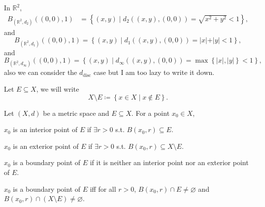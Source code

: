 \begin{eg}
    In \(\mathbb{R} ^2\), 
    \begin{align*}
        B_{(\mathbb{R} ^2, d_2)} \left( (0, 0), 1 \right) &= \left\{ (x, y) \mid d_2 ((x, y), (0, 0)) = \sqrt{x^2 + y^2}  < 1 \right\},
    \end{align*}
    and 
    \[
        B_{(\mathbb{R} ^2, d_1)}((0,0), 1) = \left\{ (x, y) \mid d_1((x, y), (0, 0)) = \vert x \vert + \vert y \vert < 1   \right\}, 
    \] and 
    \[
        B_{(\mathbb{R} ^2, d_\infty)} ((0,0), 1) = \left\{ (x, y) \mid d_\infty ((x, y), (0, 0)) = \max \left\{ \vert x \vert, \vert y \vert \right\} < 1  \right\},
    \]
    also we can consider the \(d_{\text{disc}}\) case but I am too lazy to write it down. 
\end{eg}

\begin{notation}
    Let \(E \subseteq X\), we will write 
    \[
        X \setminus E \coloneqq  \left\{ x \in X \mid x \notin E\right\}. 
    \] 
\end{notation}

\begin{definition*}
    Let \((X, d)\) be a metric space and \(E \subseteq X\). For a point \(x_0 \in X\),
    \begin{definition} \label{def: interior point}
        \(x_0\) is an interior point of \(E\) if \(\exists r > 0\) s.t. \(B(x_0, r) \subseteq E\).     
    \end{definition}
    \begin{definition} \label{def: exterior point}
        \(x_0\) is an exterior point of \(E\) if \(\exists r > 0\) s.t. \(B(x_0, r) \subseteq X \setminus E\).    
    \end{definition}
    \begin{definition} \label{def: boundary point}
        \(x_0\) is a boundary point of \(E\) if it is neither an interior point nor an exterior point of \(E\).   
    \end{definition}
\end{definition*}

\begin{proposition}
    \(x_0\) is a boundary point of \(E\) iff for all \(r>0\), \(B(x_0, r) \cap E \neq \varnothing \) and \(B(x_0, r) \cap \left( X \setminus E \right) \neq \varnothing\).     
\end{proposition}